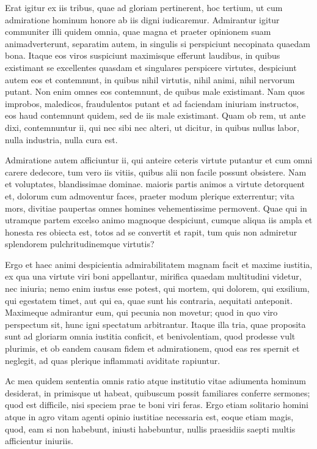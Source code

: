  Erat igitur ex iis tribus, quae ad gloriam pertinerent, hoc tertium, ut cum admiratione hominum honore ab iis digni iudicaremur. Admirantur igitur communiter illi quidem omnia, quae magna et praeter opinionem suam animadverterunt, separatim autem, in singulis si perspiciunt necopinata quaedam bona. Itaque eos viros suspiciunt maximisque efferunt laudibus, in quibus existimant se excellentes quasdam et singulares perspicere virtutes, despiciunt autem eos et contemnunt, in quibus nihil virtutis, nihil animi, nihil nervorum putant. Non enim omnes eos contemnunt, de quibus male existimant. Nam quos improbos, maledicos, fraudulentos putant et ad faciendam iniuriam instructos, eos haud contemnunt quidem, sed de iis male existimant. Quam ob rem, ut ante dixi, contemnuntur ii, qui nec sibi nec alteri, ut dicitur, in quibus nullus labor, nulla industria, nulla cura est.

 Admiratione autem afficiuntur ii, qui anteire ceteris virtute putantur et cum omni carere dedecore, tum vero iis vitiis, quibus alii non facile possunt obsistere. Nam et voluptates, blandissimae dominae. maioris partis animos a virtute detorquent et, dolorum cum admoventur faces, praeter modum plerique exterrentur; vita mors, divitiae paupertas omnes homines vehementissime permovent. Quae qui in utramque partem excelso animo magnoque despiciunt, cumque aliqua iis ampla et honesta res obiecta est, totos ad se convertit et rapit, tum quis non admiretur splendorem pulchritudinemque virtutis?

 Ergo et haec animi despicientia admirabilitatem magnam facit et maxime iustitia, ex qua una virtute viri boni appellantur, mirifica quaedam multitudini videtur, nec iniuria; nemo enim iustus esse potest, qui mortem, qui dolorem, qui exsilium, qui egestatem timet, aut qui ea, quae sunt his contraria, aequitati anteponit. Maximeque admirantur eum, qui pecunia non movetur; quod in quo viro perspectum sit, hunc igni spectatum arbitrantur. Itaque illa tria, quae proposita sunt ad gloriarm omnia iustitia conficit, et benivolentiam, quod prodesse vult plurimis, et ob eandem causam fidem et admirationem, quod eas res spernit et neglegit, ad quas plerique inflammati aviditate rapiuntur.

 Ac mea quidem sententia omnis ratio atque institutio vitae adiumenta hominum desiderat, in primisque ut habeat, quibuscum possit familiares conferre sermones; quod est difficile, nisi speciem prae te boni viri feras. Ergo etiam solitario homini atque in agro vitam agenti opinio iustitiae necessaria est, eoque etiam magis, quod, eam si non habebunt, iniusti habebuntur, nullis praesidiis saepti multis afficientur iniuriis.

